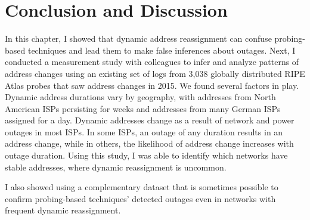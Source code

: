 
\section{Conclusion and Discussion}




In this chapter, I showed that dynamic address reassignment can confuse
probing-based techniques and lead them to make false inferences about
outages. Next, I conducted a measurement study with colleagues to infer and analyze patterns of address changes using
an existing set of logs from 3,038 globally distributed RIPE Atlas probes that saw address changes in
2015. We found several factors in play.
Dynamic address durations vary by geography, with addresses from North
American ISPs persisting for weeks and addresses from
many German ISPs assigned for a day. Dynamic addresses change as a
result of network and power outages in most ISPs. In some ISPs, an
outage of any duration results in an address change, while in others, the
likelihood of address change increases with outage duration. Using
this study, I was able to identify which networks have stable
addresses, where dynamic reassignment is uncommon.

I also showed using a complementary dataset that is sometimes possible
to confirm probing-based techniques' detected outages even in
networks with frequent dynamic reassignment. %


